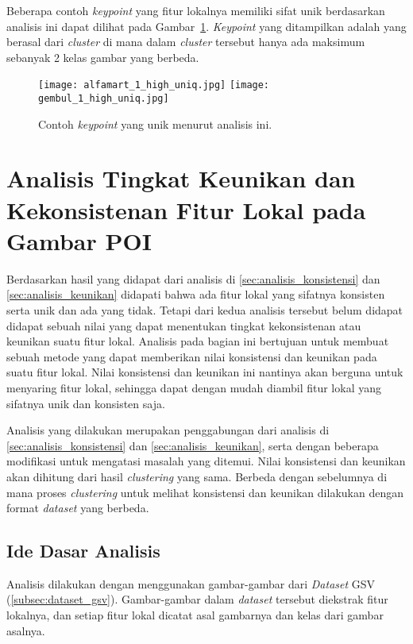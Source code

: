 Beberapa contoh \textit{keypoint} yang fitur lokalnya memiliki sifat unik berdasarkan analisis ini dapat dilihat pada Gambar~\ref{fig:keypoint_unik}. \textit{Keypoint} yang ditampilkan adalah yang berasal dari \textit{cluster} di mana dalam \textit{cluster} tersebut hanya ada maksimum sebanyak 2 kelas gambar yang berbeda.
\begin{figure}[H]
	\centering
	\texttt{[image: alfamart\_1\_high\_uniq.jpg]}
	\texttt{[image: gembul\_1\_high\_uniq.jpg]}
	\caption{Contoh \textit{keypoint} yang unik menurut analisis ini.}
	\label{fig:keypoint_unik}
\end{figure}

\section{Analisis Tingkat Keunikan dan Kekonsistenan Fitur Lokal pada Gambar POI}
\label{sec:analisis_sifat}
Berdasarkan hasil yang didapat dari analisis di \ref{sec:analisis_konsistensi} dan \ref{sec:analisis_keunikan} didapati bahwa ada fitur lokal yang sifatnya konsisten serta unik dan ada yang tidak. Tetapi dari kedua analisis tersebut belum didapat didapat sebuah nilai yang dapat menentukan tingkat kekonsistenan atau keunikan suatu fitur lokal. Analisis pada bagian ini bertujuan untuk membuat sebuah metode yang dapat memberikan nilai konsistensi dan keunikan pada suatu fitur lokal. Nilai konsistensi dan keunikan ini nantinya akan berguna untuk menyaring fitur lokal, sehingga dapat dengan mudah diambil fitur lokal yang sifatnya unik dan konsisten saja.

Analisis yang dilakukan merupakan penggabungan dari analisis di \ref{sec:analisis_konsistensi} dan \ref{sec:analisis_keunikan}, serta dengan beberapa modifikasi untuk mengatasi masalah yang ditemui. Nilai konsistensi dan keunikan akan dihitung dari hasil \textit{clustering} yang sama. Berbeda dengan sebelumnya di mana proses \textit{clustering} untuk melihat konsistensi dan keunikan dilakukan dengan format \textit{dataset} yang berbeda. 

\subsection{Ide Dasar Analisis}
\label{subsec:ide_analisis_clustering}
Analisis dilakukan dengan menggunakan gambar-gambar dari \textit{Dataset} GSV (\ref{subsec:dataset_gsv}). Gambar-gambar dalam \textit{dataset} tersebut diekstrak fitur lokalnya, dan setiap fitur lokal dicatat asal gambarnya dan kelas dari gambar asalnya. 

